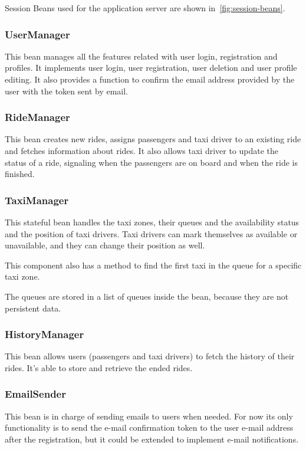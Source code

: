 Session Beans used for the application server are shown in~\autoref{fig:session-beans}.

\subsubsection{UserManager}
This bean manages all the features related with user login, registration and profiles.
It implements user login, user registration, user deletion and user profile editing.
It also provides a function to confirm the email address provided by the user with the token sent by email.

\subsubsection{RideManager}
This bean creates new rides, assigns passengers and taxi driver to an existing ride and fetches information about rides.
It also allows taxi driver to update the status of a ride, signaling when the passengers are on board and when the ride is finished.

\subsubsection{TaxiManager}
This stateful bean handles the taxi zones, their queues and the availability status and the position of taxi drivers.
Taxi drivers can mark themselves as available or unavailable, and they can change their position as well.

This component also has a method to find the first taxi in the queue for a specific taxi zone.

The queues are stored in a list of queues inside the bean, because they are not persistent data. 

\subsubsection{HistoryManager}
This bean allows users (passengers and taxi drivers) to fetch the history of their rides.
It's able to store and retrieve the ended rides.

\subsubsection{EmailSender}
This bean is in charge of sending emails to users when needed. For now its only functionality is to send the e-mail confirmation token to the user e-mail address after the registration, but it could be extended to implement e-mail notifications.

